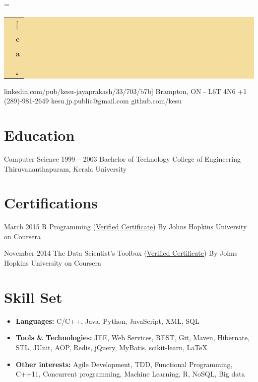 \documentclass{tccv}
\renewcommand\personal[5][]{%
    \needspace{0.5\textheight}%
    \newdimen\boxwidth%
    \boxwidth=\dimexpr\linewidth-2\fboxsep\relax%
    \colorbox[HTML]{F5DD9D}{%
    \begin{tabularx}{\boxwidth}{c|X}
    \Writinghand & {#2}\smallskip\\
    \Telefon     & {#3}\smallskip\\
    \Letter      & \href{mailto:#4}{#4}
    \ifstrempty{#1}{}{\smallskip\\ \Lightning & \href{http://#1}{#1}}
    \ifstrempty{#5}{}{\smallskip\\ \Lightning & \href{http://#5}{#5}}
    \end{tabularx}}}
\begin{document}
\personal
    [ca.linkedin.com/pub/kesu-jayaprakash/33/703/b7b]
    {Brampton, ON - L6T 4N6}
    {+1 (289)-981-2649}
    {kesu.jp.public@gmail.com}
    {github.com/kesu}

\section{Education}

\begin{yearlist}

\item[Computer Science]{1999 -- 2003}
     {Bachelor of Technology}
     {College of Engineering Thiruvananthapuram, Kerala University}
\end{yearlist}

\section{Certifications}

\begin{yearlist}

\item{March 2015}
     {R Programming (\href{https://www.coursera.org/account/accomplishments/certificate/ZNR9NY3SSH}{Verified Certificate})}
     {By Johns Hopkins University on Coursera}

\item{November 2014}
     {The Data Scientist's Toolbox (\href{https://www.coursera.org/account/accomplishments/certificate/745X8Z7SQJ}{Verified Certificate})}
     {By Johns Hopkins University on Coursera}

\end{yearlist}


\section{Skill Set}
{\begin{itemize}
\item
    {\textbf{Languages:} C/C++, Java, Python, JavaScript, XML, SQL}
\item
    {\textbf{Tools \& Technologies:} JEE, Web Services, REST, Git, Maven, Hibernate, STL, JUnit, AOP, Redis, jQuery, MyBatis, scikit-learn, \LaTeX}
\item
    {\textbf{Other interests:} Agile Development, TDD, Functional Programming, C++11, Concurrent programming, Machine Learning, R, NoSQL, Big data}
\end{itemize}}
\end{document}
